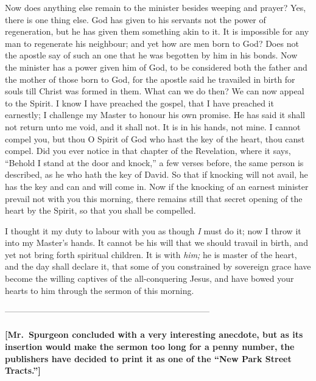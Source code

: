 \documentclass[
]{book}
\begin{document}
Now does anything else remain to the minister besides weeping and prayer? Yes, there is one thing else. God has given to his servants not the power of regeneration, but he has given them something akin to it. It is impossible for any man to regenerate his neighbour; and yet how are men born to God? Does not the apostle say of such an one that he was begotten by him in his bonds. Now the minister has a power given him of God, to be considered both the father and the mother of those born to God, for the apostle said he travailed in birth for souls till Christ was formed in them. What can we do then? We can now appeal to the Spirit. I know I have preached the gospel, that I have preached it earnestly; I challenge my Master to honour his own promise. He has said it shall not return unto me void, and it shall not. It is in his hands, not mine. I cannot compel you, but thou O Spirit of God who hast the key of the heart, thou canst compel. Did you ever notice in that chapter of the Revelation, where it says, ``Behold I stand at the door and knock,'' a few verses before, the same person is described, as he who hath the key of David. So that if knocking will not avail, he has the key and can and will come in. Now if the knocking of an earnest minister prevail not with you this morning, there remains still that secret opening of the heart by the Spirit, so that you shall be compelled.

I thought it my duty to labour with you as though \emph{I} must do it; now I throw it into my Master's hands. It cannot be his will that we should travail in birth, and yet not bring forth spiritual children. It is with \emph{him;} he is master of the heart, and the day shall declare it, that some of you constrained by sovereign grace have become the willing captives of the all-conquering Jesus, and have bowed your hearts to him through the sermon of this morning.

------------------------------------------------------------------------

\hypertarget{mr.-spurgeon-concluded-with-a-very-interesting-anecdote-but-as-its-insertion-would-make-the-sermon-too-long-for-a-penny-number-the-publishers-have-decided-to-print-it-as-one-of-the-new-park-street-tracts.}{%
\paragraph{{[}Mr.~Spurgeon concluded with a very interesting anecdote, but as its insertion would make the sermon too long for a penny number, the publishers have decided to print it as one of the ``New Park Street Tracts.''{]}}\label{mr.-spurgeon-concluded-with-a-very-interesting-anecdote-but-as-its-insertion-would-make-the-sermon-too-long-for-a-penny-number-the-publishers-have-decided-to-print-it-as-one-of-the-new-park-street-tracts.}}
\end{document}
